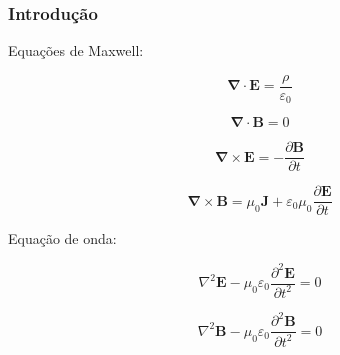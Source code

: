 \documentclass[10pt]{beamer}
\begin{document}
\begin{frame}
\frametitle{Introdução}

Equações de Maxwell:

\vspace{0.05\linewidth}

\noindent
\begin{minipage}{.5\linewidth}
\begin{equation}
  \boldsymbol{\nabla} \cdot \mathbf{E} = \frac{\rho}{\varepsilon_0}
\end{equation}
\end{minipage}%
\begin{minipage}{.5\linewidth}
\begin{equation}
 \boldsymbol{\nabla} \cdot \mathbf{B} = 0
\end{equation}
\end{minipage}

\vspace{0.05\linewidth}

\noindent
\begin{minipage}{.5\linewidth}
\begin{equation}
  \boldsymbol{\nabla} \times \mathbf{E} =  -\frac{\partial \mathbf{B}}{\partial t}
\end{equation}
\end{minipage}%
\begin{minipage}{.5\linewidth}
\begin{equation}
 \boldsymbol{\nabla} \times \mathbf{B} = \mu_0 \mathbf{J} + \varepsilon_0 \mu_0 \frac{\partial \mathbf{E}}{\partial t}
\end{equation}
\end{minipage}

\vspace{0.05\linewidth}
Equação de onda:

\vspace{0.05\linewidth}
\noindent
\begin{minipage}{.5\linewidth}
    \begin{equation}
        \nabla^2 \mathbf{E} - \mu_0 \varepsilon_0 \frac{\partial^2 \mathbf{E}}{\partial t^2} = 0
    \end{equation}
\end{minipage}%
\noindent
\begin{minipage}{.5\linewidth}
    \begin{equation}
        \nabla^2 \mathbf{B} - \mu_0 \varepsilon_0 \frac{\partial^2 \mathbf{B}}{\partial t^2} = 0
    \end{equation}
\end{minipage}
\end{frame}
\end{document}
